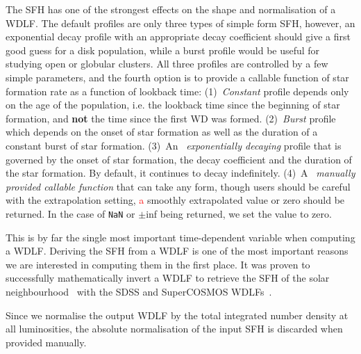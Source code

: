 \documentclass[fleqn,usenatbib]{rasti}
\begin{document}
The SFH has one of the strongest effects on the shape and normalisation of a
WDLF. The default profiles are only three types of simple form SFH, however,
an exponential decay profile with an appropriate decay coefficient should give a
first good guess for a disk population, while a burst profile would be useful
for studying open or globular clusters. All three profiles are controlled by
a few simple parameters, and the fourth option is to provide a callable
function of star formation rate as a function of lookback time:
(1)~\textit{Constant} profile depends only on the age of the population,
i.e. the lookback time since the beginning of star formation,
and \textbf{not} the time since the first WD was formed. (2)~\textit{Burst}
profile which depends on the onset of star formation as well as the duration
of a constant burst of star formation. (3)~An ~\textit{exponentially decaying}
profile that is governed by the onset of star formation, the decay coefficient
and the duration of the star formation. By default, it continues to decay
indefinitely. (4)~A ~\textit{manually provided callable function} that can take
any form, though users should be careful with the extrapolation setting,
\textcolor{red}{a} smoothly extrapolated value or zero should be returned. In
the case of \verb+NaN+ or $\pm$inf being returned, we set the value to zero.

This is by far the single most important time-dependent variable when
computing a WDLF. Deriving the SFH from a WDLF is one of the most important
reasons we are interested in computing them in the first place. It was proven
to successfully mathematically invert a WDLF to retrieve the SFH of the solar
neighbourhood~\citep{2013MNRAS.434.1549R} with the SDSS and SuperCOSMOS
WDLFs~\citep{2006AJ....132.1221H, 2011MNRAS.417...93R}.

Since we normalise the output WDLF by the total integrated number density at
all luminosities, the absolute normalisation of the input SFH is discarded when
provided manually.
\end{document}
